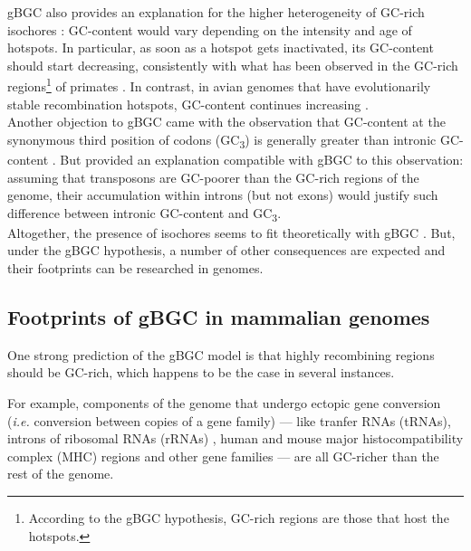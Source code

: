 gBGC also provides an explanation for the higher heterogeneity of GC-rich isochores \citep{clay2001compositional,clay2001compositionala}: GC-content would vary depending on the intensity and age of hotspots.
In particular, as soon as a hotspot gets inactivated, its GC-content should start decreasing, consistently with what has been observed in the GC-rich regions\footnote{According to the gBGC hypothesis, GC-rich regions are those that host the hotspots.} of primates \citep{duret2002vanishing,belle2004decline,meunier2004recombination,duret2006gc}.
In contrast, in avian genomes that have evolutionarily stable recombination hotspots, GC-content continues increasing \citep{webster2006strong,capra2011substitution,mugal2013twisted}.\\


Another objection to gBGC \citep{eyre-walker1999evidence} came with the observation that GC-content at the synonymous third position of codons (GC\textsubscript{3}) is generally greater than intronic GC-content \citep{clay1996human}.
But \citet{duret2001elevated} provided an explanation compatible with gBGC to this observation: assuming that transposons are GC-poorer than the GC-rich regions of the genome, their accumulation within introns (but not exons) would justify such difference between intronic GC-content and GC\textsubscript{3}.\\

Altogether, the presence of isochores seems to fit theoretically with gBGC \citep{duret2006new}.
But, under the gBGC hypothesis, a number of other consequences are expected and their footprints can be researched in genomes.



\subsection{Footprints of gBGC in mammalian genomes}

One strong prediction of the gBGC model is that highly recombining regions should be GC-rich, which happens to be the case in several instances.

For example, components of the genome that undergo ectopic gene conversion (\textit{i.e.} conversion between copies of a gene family) — like tranfer RNAs (tRNAs), introns of ribosomal RNAs (rRNAs) \citep{galtier2001gccontent}, human and mouse major histocompatibility complex (MHC) regions \citep{hogstrand1999gene} and other gene families \citep{backstrom2005gene,galtier2003gene,kudla2004gene} — are all GC-richer than the rest of the genome.

